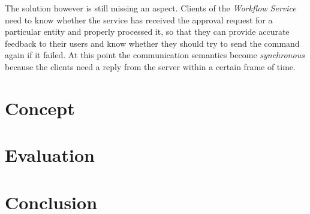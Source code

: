 The solution however is still missing an aspect.
Clients of the \emph{Workflow Service} need to know whether the service has received the approval request for a particular entity and properly processed it, so that they can provide accurate feedback to their users and know whether they should try to send the command again if it failed.
At this point the communication semantics become \emph{synchronous} because the clients need a reply from the server within a certain frame of time.

\clearpage
\section{Concept}\label{sec:concept}

\clearpage
\section{Evaluation}\label{sec:evaluation}

\clearpage
\section{Conclusion}\label{sec:conclusion}
